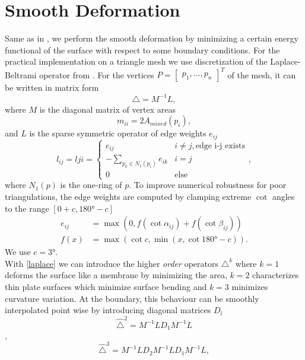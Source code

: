 \documentclass[twocolumn]{article}
\begin{document}
\section{Smooth Deformation}
Same as in \cite{botsch2004intuitive}, we perform the smooth deformation by minimizing a certain energy functional of the surface with respect to some boundary conditions. For the practical implementation on a triangle mesh we use discretization of the Laplace-Beltrami operator from \cite{meyer2003discrete}. For the vertices $P = \begin{bmatrix}p_1,\dots, p_n\end{bmatrix}^T$ of the mesh, it can be written in matrix form
\begin{equation}\label{laplace}
\triangle = M^{-1} L,
\end{equation}
where $M$ is the diagonal matrix of vertex areas 
\begin{equation*}
m_{ii} = 2 A_{mixed}(p_i),
\end{equation*} and $L$ is the sparse symmetric operator of edge weights $e_{ij}$
\begin{equation*}
l_{ij} = l{ji} = \begin{cases} e_{ij} & i \neq j, \text{edge i-j exists} \\ -\sum_{p_k \in N_1(p_i)} e_{ik} & i=j \\ 0 & \text{else}  \end{cases},
\end{equation*}
where $N_1(p)$ is the one-ring of $p$. To improve numerical robustness for poor triangulations, the edge weights are computed by clamping extreme $\cot$ angles to the range $[0+c,\ang{180}-c]$
\begin{align*}
e_{ij} &= \max(0, f(\cot \alpha_{ij}) + f(\cot \beta_{ij})) \\
f(x) &= \max(\cot c, \min(x, \cot \ang{180}-c)).
\end{align*}
We use $c = \ang{3}$.\\
With \eqref{laplace} we can introduce the higher \textit{order} operators $\triangle^k$ where $k=1$ deforms the surface like a membrane by minimizing the area, $k=2$ characterizes thin plate surfaces which minimize
surface bending and $k=3$ minimizes curvature variation. At the boundary, this behaviour can be smoothly interpolated point wise by introducing diagonal matrices $D_l$ 
\begin{equation}\label{laplace2}
\hat{\triangle}^2 = M^{-1} L D_1 M^{-1} L
\end{equation} ,
\begin{equation}\label{laplace3}
\hat{\triangle}^3 = M^{-1}LD_2 M^{-1} L D_1 M^{-1} L,
\end{equation}
\end{document}
